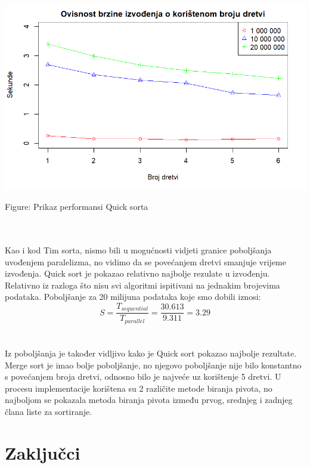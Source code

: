 \documentclass[conference]{IEEEtran}
\begin{document}
\\

\noindent
\begin{minipage}{\linewidth}
\centering
\includegraphics[width=1\linewidth]{quickPerf.png}
\caption{Figure: Prikaz performansi Quick sorta}
\label{quick - performance}
\end{minipage}
\\

\\
Kao i kod Tim sorta, nismo bili u mogućnosti vidjeti granice poboljšanja uvođenjem paralelizma, no vidimo da se povećanjem dretvi smanjuje vrijeme izvođenja.
Quick sort je pokazao relativno najbolje rezulate u izvođenju. Relativno iz razloga što nisu svi algoritmi ispitivani na jednakim brojevima podataka. Poboljšanje za 20 milijuna podataka koje smo dobili iznosi: 
\\
\begin{equation}
S = \frac{T_{sequential}}{T_{parallel}}
= \frac{30.613}{9.311} = 3.29
\label{eq:performance}
\end{equation}
\\
\\
Iz poboljšanja je također vidljivo kako je Quick sort pokazao najbolje rezultate. Merge sort je imao bolje poboljšanje, no njegovo poboljšanje nije bilo konstantno s povećanjem broja dretvi, odnosno bilo je najveće uz korištenje 5 dretvi. U procesu implementacije korištena su 2 različite metode biranja pivota, no najboljom se pokazala metoda biranja pivota između prvog, srednjeg i zadnjeg člana liste za sortiranje.

\section*{Zaključci}
\end{document}
